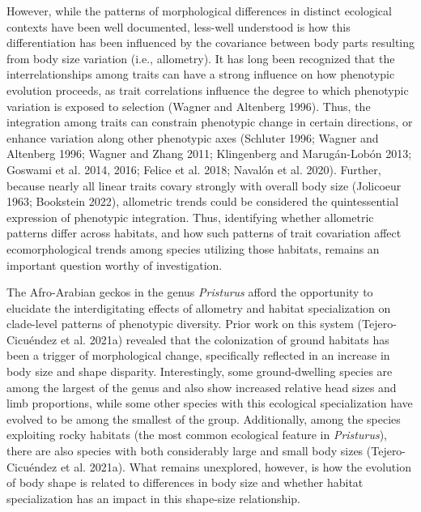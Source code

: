 \documentclass[
  11pt,
]{article}
\begin{document}
However, while the patterns of morphological differences in distinct
ecological contexts have been well documented, less-well understood is
how this differentiation has been influenced by the covariance between
body parts resulting from body size variation (i.e., allometry). It has
long been recognized that the interrelationships among traits can have a
strong influence on how phenotypic evolution proceeds, as trait
correlations influence the degree to which phenotypic variation is
exposed to selection (Wagner and Altenberg 1996). Thus, the integration
among traits can constrain phenotypic change in certain directions, or
enhance variation along other phenotypic axes (Schluter 1996; Wagner and
Altenberg 1996; Wagner and Zhang 2011; Klingenberg and Marugán-Lobón
2013; Goswami et al. 2014, 2016; Felice et al. 2018; Navalón et al.
2020). Further, because nearly all linear traits covary strongly with
overall body size (Jolicoeur 1963; Bookstein 2022), allometric trends
could be considered the quintessential expression of phenotypic
integration. Thus, identifying whether allometric patterns differ across
habitats, and how such patterns of trait covariation affect
ecomorphological trends among species utilizing those habitats, remains
an important question worthy of investigation. \hfill\break

The Afro-Arabian geckos in the genus \emph{Pristurus} afford the
opportunity to elucidate the interdigitating effects of allometry and
habitat specialization on clade-level patterns of phenotypic diversity.
Prior work on this system (Tejero-Cicuéndez et al. 2021a) revealed that
the colonization of ground habitats has been a trigger of morphological
change, specifically reflected in an increase in body size and shape
disparity. Interestingly, some ground-dwelling species are among the
largest of the genus and also show increased relative head sizes and
limb proportions, while some other species with this ecological
specialization have evolved to be among the smallest of the group.
Additionally, among the species exploiting rocky habitats (the most
common ecological feature in \emph{Pristurus}), there are also species
with both considerably large and small body sizes (Tejero-Cicuéndez et
al. 2021a). What remains unexplored, however, is how the evolution of
body shape is related to differences in body size and whether habitat
specialization has an impact in this shape-size relationship.
\hfill\break
\end{document}
